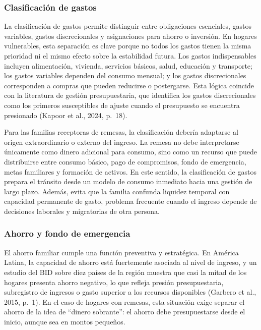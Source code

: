 \documentclass[12pt,letterpaper]{article}
\begin{document}
\subsubsection{\texorpdfstring{\textbf{Clasificación de gastos}}{Clasificación de gastos}}\label{clasificaciuxf3n-de-gastos}

La clasificación de gastos permite distinguir entre obligaciones esenciales, gastos variables, gastos discrecionales y asignaciones para ahorro o inversión. En hogares vulnerables, esta separación es clave porque no todos los gastos tienen la misma prioridad ni el mismo efecto sobre la estabilidad futura. Los gastos indispensables incluyen alimentación, vivienda, servicios básicos, salud, educación y transporte; los gastos variables dependen del consumo mensual; y los gastos discrecionales corresponden a compras que pueden reducirse o postergarse. Esta lógica coincide con la literatura de gestión presupuestaria, que identifica los gastos discrecionales como los primeros susceptibles de ajuste cuando el presupuesto se encuentra presionado (Kapoor et al., 2024, p.~18).

Para las familias receptoras de remesas, la clasificación debería adaptarse al origen extraordinario o externo del ingreso. La remesa no debe interpretarse únicamente como dinero adicional para consumo, sino como un recurso que puede distribuirse entre consumo básico, pago de compromisos, fondo de emergencia, metas familiares y formación de activos. En este sentido, la clasificación de gastos prepara el tránsito desde un modelo de consumo inmediato hacia una gestión de largo plazo. Además, evita que la familia confunda liquidez temporal con capacidad permanente de gasto, problema frecuente cuando el ingreso depende de decisiones laborales y migratorias de otra persona.

\subsubsection{\texorpdfstring{\textbf{Ahorro y fondo de emergencia}}{Ahorro y fondo de emergencia}}\label{ahorro-y-fondo-de-emergencia}

El ahorro familiar cumple una función preventiva y estratégica. En América Latina, la capacidad de ahorro está fuertemente asociada al nivel de ingreso, y un estudio del BID sobre diez países de la región muestra que casi la mitad de los hogares presenta ahorro negativo, lo que refleja presión presupuestaria, subregistro de ingresos o gasto superior a los recursos disponibles (Garbero et al., 2015, p.~1). En el caso de hogares con remesas, esta situación exige separar el ahorro de la idea de ``dinero sobrante'': el ahorro debe presupuestarse desde el inicio, aunque sea en montos pequeños.
\end{document}
